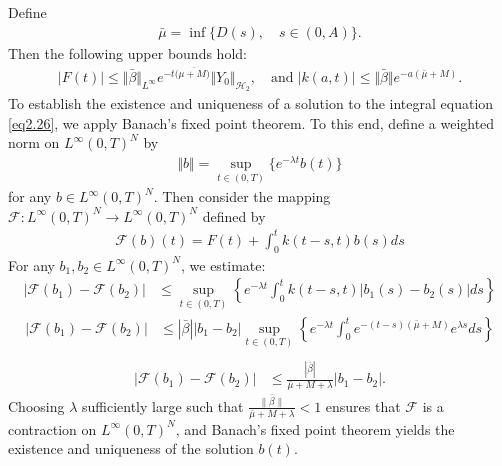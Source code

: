 \documentclass[10pt, a4paper]{amsart}
\makeatletter
\theoremstyle{plain}
\theoremstyle{definition}
\theoremstyle{remark}
\renewenvironment{proof}[1][\proofname]{\par
  \pushQED{\qed}%
  \normalfont \topsep6\p@\@plus6\p@\relax
  \trivlist
  \item[\hskip\labelsep
        \itshape
    #1\ \ref{#1}.]\ignorespaces
}{%
  \popQED\endtrivlist\@endpefalse
}
\numberwithin{equation}{section}
\def\to{\rightarrow}
\makeatother
\begin{document}
\begin{proof}[of Theorem \ref{th2.7}]
Define
\begin{align}
    \bar{\mu}=\inf\lbrace D(s),\quad s\in (0,A)\rbrace.
\end{align}
 Then the following upper bounds hold:
 \begin{align}
    \vert F(t)\vert \leq \Vert\bar{\beta}\Vert_{L^{\infty}}e^{-t(\bar{\mu+M)}}\Vert Y_0\Vert_{\mathcal{H}_2},\quad\text{and}\;\vert k(a,t)\vert\leq \Vert\bar{\beta}\Vert e^{-a(\bar{\mu}+M)}.
\end{align}
 To establish the existence and uniqueness of a solution to the integral equation \eqref{eq2.26}, we apply Banach’s fixed point theorem. To this end, define a weighted norm on $L^\infty(0,T)^N$ by
 \begin{align}
\Vert b\Vert=\sup_{t\in(0,T)}\lbrace e^{-\lambda t}b(t)\rbrace
\end{align}
 for any $b \in L^\infty(0,T)^N$. Then consider the mapping $\mathcal{F} : L^\infty(0,T)^N \to L^\infty(0,T)^N$ defined by
 \begin{align}
\mathcal{F}(b)(t)=F(t)+\displaystyle\int_0^t k(t-s,t)b(s)ds
\end{align}
 For any $b_1, b_2 \in L^\infty(0,T)^N$, we estimate:
 \begin{align}
     |\mathcal{F}(b_1) - \mathcal{F}(b_2)|
 &\leq \sup_{t \in (0,T)} \left\lbrace e^{-\lambda t} \int_0^t k(t-s, t)|b_1(s) - b_2(s)|ds \right\rbrace 
 \end{align}
\begin{align*}
|\mathcal{F}(b_1) - \mathcal{F}(b_2)|
 &\leq |\bar{\beta}| |b_1 - b_2|  \sup_{t \in (0,T)} \left\lbrace e^{-\lambda t} \int_0^t e^{-(t-s)(\bar{\mu}+M)}e^{\lambda s}ds \right\rbrace \\
 \end{align*}
\begin{align}
   |\mathcal{F}(b_1) - \mathcal{F}(b_2)|
 & \leq  \frac{|\bar{\beta}|}{\bar{\mu}+M+\lambda} |b_1 - b_2|.
\end{align}
Choosing $\lambda$ sufficiently large such that  $\frac{\|\bar{\beta}\|}{\bar{\mu}+M+\lambda}<1$ ensures that $\mathcal{F}$ is a contraction on $L^\infty(0,T)^N$, and Banach's fixed point theorem yields the existence and uniqueness of the solution $b(t)$.
\end{proof}
\end{document}
